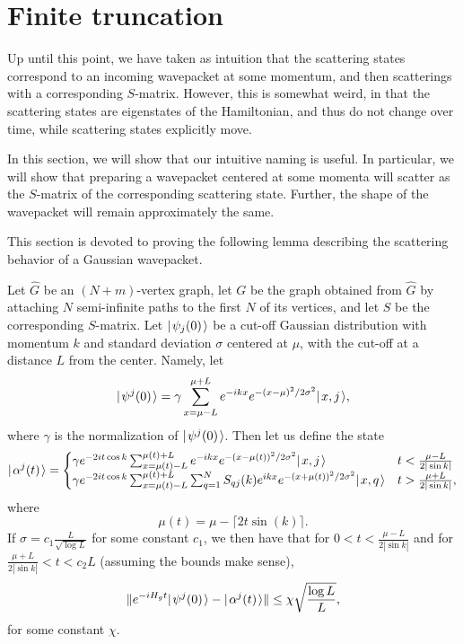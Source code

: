 \documentclass[../thesis-main/thesis-main]{subfiles}
\begin{document}
\section{Finite truncation}

Up until this point, we have taken as intuition that the scattering states correspond to an incoming wavepacket at some momentum, and then scatterings with a corresponding $S$-matrix.  However, this is somewhat weird, in that the scattering states are eigenstates of the Hamiltonian, and thus do not change over time, while scattering states explicitly move.  

In this section, we will show that our intuitive naming is useful.  In particular, we will show that preparing a wavepacket centered at some momenta will scatter as the $S$-matrix of the corresponding scattering state.  Further, the shape of the wavepacket will remain approximately the same.

This section is devoted to proving the following lemma describing the scattering behavior of a Gaussian wavepacket.

\begin{theorem}
  Let $\widehat{G}$ be an $(N+m)$-vertex graph, let $G$ be the graph obtained from $\widehat{G}$ by attaching $N$ semi-infinite paths to the first $N$ of its vertices, and let $S$ be the corresponding $S$-matrix.  Let $|\mspace{2mu} \psi_j(0) \mspace{2mu} \rangle$ be a cut-off Gaussian distribution with momentum $k$ and standard deviation $\sigma$ centered at $\mu$, with the cut-off at a distance $L$ from the center.  Namely, let 
  \begin{equation}
    |\mspace{2mu} \psi^j(0) \mspace{2mu} \rangle = \gamma \sum_{x = \mu - L}^{\mu + L} e^{- i k x} e^{- (x - \mu)^2/2\sigma^2} |\mspace{2mu} x,j \mspace{2mu} \rangle  \label{eq:guass_start_defn},
  \end{equation}
  where $\gamma$ is the normalization of $|\mspace{2mu} \psi^j(0) \mspace{2mu} \rangle$.  Then let us define the state 
  \begin{equation}
    |\mspace{2mu} \alpha^j(t) \mspace{2mu} \rangle =\begin{cases}  \gamma e^{-2 i t \cos k} \sum_{x = \mu(t) -L}^{\mu(t)+L} e^{-i k x} e^{ -(x - \mu(t))^2/2\sigma^2} 
    			 |\mspace{2mu} x,j \mspace{2mu} \rangle & t < \frac{\mu-L}{2|\sin k|}\\
			 \gamma e^{-2 i t \cos k} \sum_{x = \mu(t)-L}^{\mu(t) + L} \sum_{q=1}^N  S_{qj}(k) e^{i k x} e^{-(x + \mu(t))^2/2\sigma^2} |\mspace{2mu} x,q \mspace{2mu} \rangle & t > \frac{\mu+L}{2|\sin k|},\end{cases}\label{eq:guass_approximation_defn}
  \end{equation}
  where
  \begin{equation}
    \mu(t) = \mu - \lceil 2 t \sin(k)\rceil.
  \end{equation}
  If $\sigma = c_1 \frac{ L}{\sqrt{\log L}}$ for some constant $c_1$, we then have that for $0 < t < \frac{\mu - L}{2|\sin k|}$ and for $\frac{\mu + L}{2|\sin k|} < t < c_2 L$ (assuming the bounds make sense),  
  \begin{equation}
    \|{e^{-i H_g t} |\mspace{2mu} \psi^j(0) \mspace{2mu} \rangle - |\mspace{2mu} \alpha^j (t) \mspace{2mu} \rangle}\| \leq \chi \sqrt{\frac{\log L}{L}},
  \end{equation}  
  for some constant $\chi$.
\label{thm:single_particle_wavepacket_bound}
\end{theorem}
\end{document}
